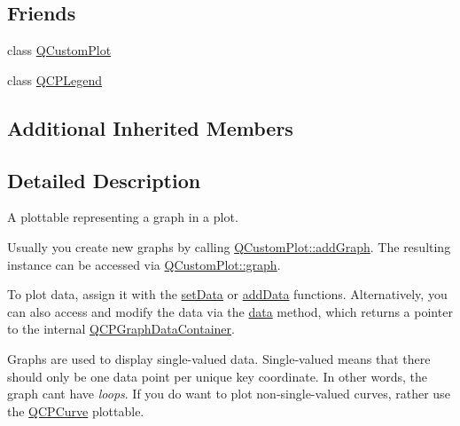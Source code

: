 \subsection*{Friends}
\begin{DoxyCompactItemize}
\item 
class \mbox{\hyperlink{class_q_c_p_graph_a1cdf9df76adcfae45261690aa0ca2198}{Q\+Custom\+Plot}}
\item 
class \mbox{\hyperlink{class_q_c_p_graph_a8429035e7adfbd7f05805a6530ad5e3b}{Q\+C\+P\+Legend}}
\end{DoxyCompactItemize}
\subsection*{Additional Inherited Members}


\subsection{Detailed Description}
A plottable representing a graph in a plot. 



Usually you create new graphs by calling \mbox{\hyperlink{class_q_custom_plot_a6fb2873d35a8a8089842d81a70a54167}{Q\+Custom\+Plot\+::add\+Graph}}. The resulting instance can be accessed via \mbox{\hyperlink{class_q_custom_plot_a6ecae130f684b25276fb47bd3a5875c6}{Q\+Custom\+Plot\+::graph}}.

To plot data, assign it with the \mbox{\hyperlink{class_q_c_p_graph_a1eae9429a316b008e2d99b2d65a54395}{set\+Data}} or \mbox{\hyperlink{class_q_c_p_graph_ae0555c0d3fe0fa7cb8628f88158d420f}{add\+Data}} functions. Alternatively, you can also access and modify the data via the \mbox{\hyperlink{class_q_c_p_graph_a141aa31a1f19bbd0ce60f55eaeb9ea60}{data}} method, which returns a pointer to the internal \mbox{\hyperlink{qcustomplot_8h_a2e5583d1ae212f0deb10537cf975a15a}{Q\+C\+P\+Graph\+Data\+Container}}.

Graphs are used to display single-\/valued data. Single-\/valued means that there should only be one data point per unique key coordinate. In other words, the graph can\textquotesingle{}t have {\itshape loops}. If you do want to plot non-\/single-\/valued curves, rather use the \mbox{\hyperlink{class_q_c_p_curve}{Q\+C\+P\+Curve}} plottable.

